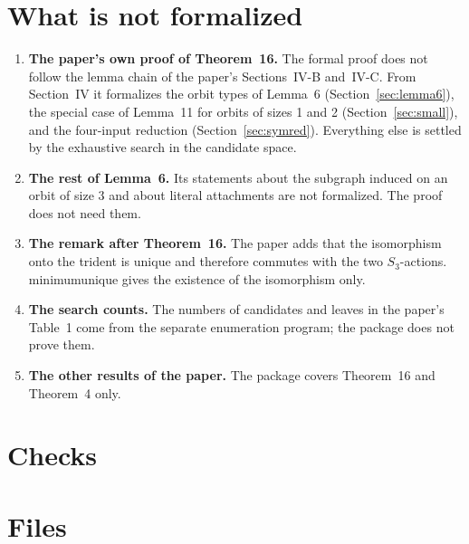 \documentclass[11pt,a4paper]{article}
\newcommand{\leanus}{\textunderscore\allowbreak}
\newcommand{\lean}[1]{{\ttfamily\let\_\leanus #1}}
\theoremstyle{definition}
\begin{document}
\section{What is not formalized}\label{sec:gaps}
\begin{enumerate}
\item \textbf{The paper's own proof of Theorem~16.} The formal proof does
not follow the lemma chain of the paper's Sections~IV-B and~IV-C. From
Section~IV it formalizes the orbit types of Lemma~6
(Section~\ref{sec:lemma6}), the special case of Lemma~11 for orbits of sizes
1 and 2 (Section~\ref{sec:small}), and the four-input reduction
(Section~\ref{sec:symred}). Everything else is settled by the exhaustive
search in the candidate space.
\item \textbf{The rest of Lemma~6.} Its statements about the subgraph induced
on an orbit of size 3 and about literal attachments are not formalized. The
proof does not need them.
\item \textbf{The remark after Theorem~16.} The paper adds that the
isomorphism onto the trident is unique and therefore commutes with the two
$S_3$-actions. \lean{minimum\_unique} gives the existence of the isomorphism
only.
\item \textbf{The search counts.} The numbers of candidates and leaves in
the paper's Table~1 come from the separate enumeration program; the package
does not prove them.
\item \textbf{The other results of the paper.} The package covers Theorem~16
and Theorem~4 only.
\end{enumerate}

\section{Checks}\label{sec:checks}


\appendix
\section{Files}

\end{document}
